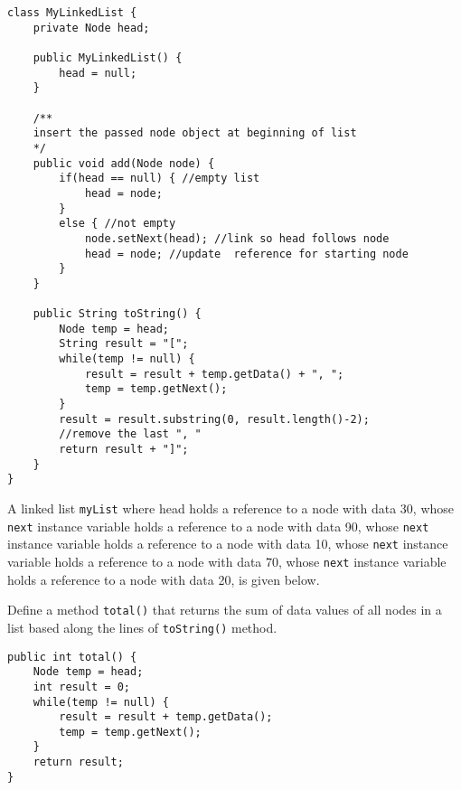 \begin{lstlisting}[linewidth=15.5cm]
class MyLinkedList {
	private Node head;
	
	public MyLinkedList() {
		head = null;
	}
	
	/**
	insert the passed node object at beginning of list
	*/
	public void add(Node node) {
		if(head == null) { //empty list
			head = node; 
		}
		else { //not empty
			node.setNext(head); //link so head follows node
			head = node; //update  reference for starting node
		}
	}
	
	public String toString() {
		Node temp = head;
		String result = "[";
		while(temp != null) {
			result = result + temp.getData() + ", ";
			temp = temp.getNext();
		}
		result = result.substring(0, result.length()-2); 
		//remove the last ", "
		return result + "]";
	}
}
\end{lstlisting}

A linked list \texttt{myList} where head holds a reference to a node with data 30, whose \texttt{next} instance variable holds a reference to a node with data 90, whose \texttt{next} instance variable holds a reference to a node with data 10, whose \texttt{next} instance variable holds a reference to a node with data 70, whose \texttt{next} instance variable holds a reference to a node with data 20, is given below.

\vskip 0.5cm


\begin{exercise}[5]
Define a method \texttt{total()} that returns the sum of data values of all nodes in a list based along the lines of \texttt{toString()} method.	
\end{exercise}
\begin{answer}
\begin{lstlisting}
public int total() {
	Node temp = head;
	int result = 0;
	while(temp != null) {
		result = result + temp.getData();
		temp = temp.getNext();
	}
	return result;
}
\end{lstlisting}	
\end{answer}

